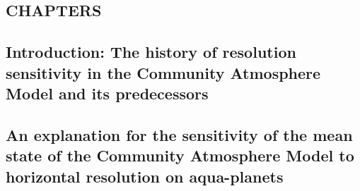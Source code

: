 \documentclass[12pt]{article}
\begin{document}
\newpage
{}

\newpage
\begin{center}
\section*{\bf{\normalsize CHAPTERS}}
\end{center}

\newpage
\begin{center}
\section{Introduction: The history of resolution sensitivity in the Community Atmosphere Model and its predecessors}
\end{center}


\newpage
\begin{center}
\section{An explanation for the sensitivity of the mean state of the Community Atmosphere Model to horizontal resolution on aqua-planets}
\end{center}

\end{document}
